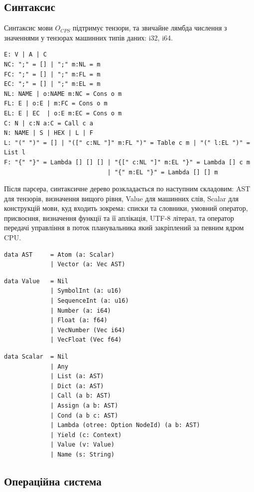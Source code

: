 \begin{definition}
\begin{definition}
\begin{definition}
\begin{definition}
\newpage
\subsection{Синтаксис}

Синтаксис мови $O_{CPS}$ підтримує тензори, та звичайне лямбда числення
з значеннями у тензорах машинних типів даних: i32, i64.

\begin{lstlisting}[mathescape=true]
E: V | A | C
NC: ";" = [] | ";" m:NL = m
FC: ";" = [] | ";" m:FL = m
EC: ";" = [] | ";" m:EL = m
NL: NAME | o:NAME m:NC = Cons o m
FL: E | o:E | m:FC = Cons o m
EL: E | EC  | o:E m:EC = Cons o m
C: N | c:N a:C = Call c a
N: NAME | S | HEX | L | F
L: "(" ")" = [] | "([" c:NL "]" m:FL ")" = Table c m | "(" l:EL ")" = List l
F: "{" "}" = Lambda [] [] [] | "{[" c:NL "]" m:EL "}" = Lambda [] c m
                             | "{" m:EL "}" = Lambda [] [] m
\end{lstlisting}

Після парсера, синтаксичне дерево розкладається по наступним складовим: AST для
тензорів, визначення вищого рівня, Value для машинних слів, Scalar для
конструкцій мови, куд входить зокрема: списки та словники, умовний оператор,
присвоєння, визначення функції та її аплікація, UTF-8 літерал, та оператор
передачі управління в поток планувальника який закріплений за певним ядром CPU.

\begin{lstlisting}
data AST     = Atom (a: Scalar)
             | Vector (a: Vec AST)
\end{lstlisting}

\begin{lstlisting}
data Value   = Nil
             | SymbolInt (a: u16)
             | SequenceInt (a: u16)
             | Number (a: i64)
             | Float (a: f64)
             | VecNumber (Vec i64)
             | VecFloat (Vec f64)
\end{lstlisting}

\begin{lstlisting}
data Scalar  = Nil
             | Any
             | List (a: AST)
             | Dict (a: AST)
             | Call (a b: AST)
             | Assign (a b: AST)
             | Cond (a b c: AST)
             | Lambda (otree: Option NodeId) (a b: AST)
             | Yield (c: Context)
             | Value (v: Value)
             | Name (s: String)
\end{lstlisting}


\newpage
\subsection{Операційна система}


\end{definition}
\end{definition}
\end{definition}
\end{definition}
